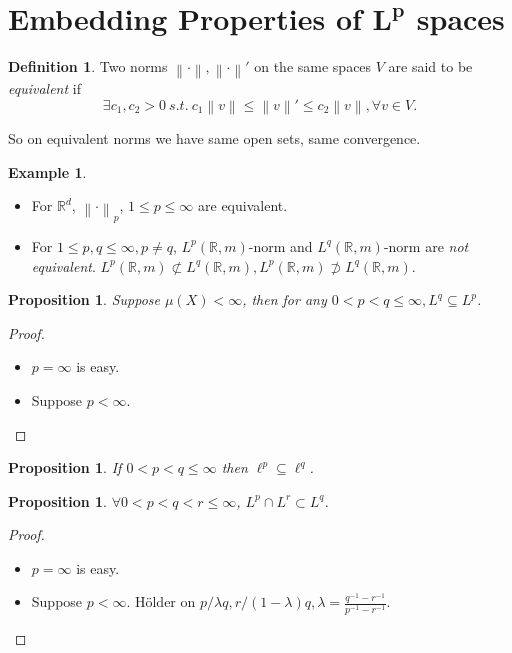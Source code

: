 \documentclass{report}
\newcommand{\R}{\mathbb{R}}
\newcommand{\st}{\ s.t.\ }
\newcommand{\norm}[1]{\left\| #1 \right\|}
\newtheorem{proposition}[theorem]{Proposition}
\theoremstyle{definition}
\newtheorem{definition}[theorem]{Definition}
\newtheorem{example}[theorem]{Example}
\theoremstyle{remark}
\newcommand{\fnl}{\parbox[t]{0\linewidth}{}}
\newcommand*\ttlmath[2]{\texorpdfstring{$\boldsymbol{#1}$}{#2}}
\begin{document}
\section{Embedding Properties of \ttlmath{L^p}{L\textasciicircum p} spaces}
\begin{definition}
	Two norms $\norm{\cdot}, \norm{\cdot}'$ on the same spaces $V$ are said to be \emph{equivalent} if \[\exists c_1, c_2 > 0 \st c_1\norm{v} \leq \norm{v}' \leq c_2 \norm{v}, \forall v \in V.\]
\end{definition}
So on equivalent norms we have same open sets, same convergence.
\begin{example} \fnl
	\begin{itemize}
		\item For $\R^d$, $\norm{\cdot}_p$, $1 \leq p \leq \infty$ are equivalent.
		\item For $1 \leq p, q \leq \infty, p \neq q$, $L^p(\R, m)$-norm and $L^q(\R, m)$-norm are \emph{not equivalent}. $L^p(\R, m) \not\subset L^q(\R, m), L^p(\R, m) \not\supset L^q(\R, m)$.
	\end{itemize}
\end{example}

\begin{proposition}
	Suppose $\mu(X) < \infty$, then for any $0 < p < q \leq \infty, L^q \subseteq L^p$.
\end{proposition}
\begin{proof}
	\begin{itemize}
		\item $p = \infty$ is easy.
		\item Suppose $p < \infty$. \qedhere
	\end{itemize}
\end{proof}

\begin{proposition}
	If $0 < p < q \leq \infty$ then $\ell^p \subseteq \ell^q$.
\end{proposition}


\begin{proposition}
	$\forall 0 < p < q < r \leq \infty$, $L^p \cap L^r \subset L^q$.
\end{proposition}
\begin{proof}
	\begin{itemize}
		\item $p = \infty$ is easy.
		\item Suppose $p < \infty$. Hölder on $p/\lambda q, r/(1-\lambda)q, \lambda = \frac{q^{-1} - r^{-1}}{p^{-1} - r^{-1}}$. \qedhere
	\end{itemize}
\end{proof}
\end{document}
